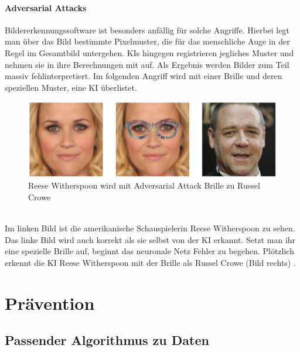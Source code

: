 \documentclass[12pt,oneside,a4paper,parskip]{scrbook}
\begin{document}
\subsubsection{Adversarial Attacks}
Bildererkennungssoftware ist besonders anfällig für solche Angriffe.
Hierbei legt man über das Bild bestimmte Pixelmuster, die für das menschliche Auge in der Regel im Gesamtbild untergehen. KIs hingegen registrieren jegliches Muster und nehmen sie in ihre Berechnungen mit auf. Als Ergebnis werden Bilder zum Teil massiv fehlinterpretiert.
Im folgenden Angriff wird mit einer Brille und deren speziellen Muster, eine KI überlistet.
\label{section:BrilleAttack}
\begin{figure}[h]
	\begin{center}
		\includegraphics[width=15cm]{Bilder/Brille_Adversarial_Attack.png}
		\caption{Reese Witherspoon wird mit Adversarial Attack Brille zu Russel Crowe\cite{Attack}}
		\label{fig:BrilleAttack}
	\end{center}
\end{figure}
\\Im linken Bild ist die amerikanische Schauspielerin Reese Witherspoon zu sehen. Das linke Bild wird auch korrekt als sie selbst von der KI erkannt. Setzt man ihr eine spezielle Brille auf, beginnt das neuronale Netz Fehler zu begehen. Plötzlich erkennt die KI Reese Witherspoon mit der Brille als Russel Crowe (Bild rechts) \cite{Attack}.

\chapter{Prävention}
\label{chapter:main}
\section{Passender Algorithmus zu Daten}
\end{document}
